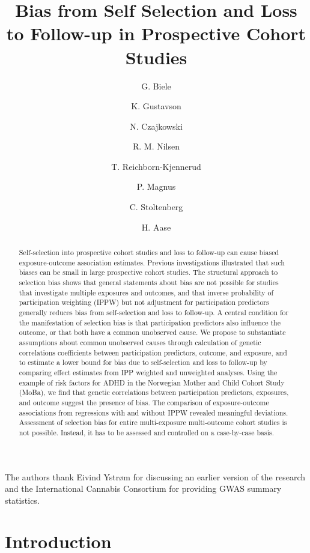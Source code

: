 \documentclass[12pt]{article}
\title{Bias from Self Selection and Loss to Follow-up in Prospective Cohort Studies}
\author{G. Biele \and K. Gustavson \and N. Czajkowski \and R. M. Nilsen \and T. Reichborn-Kjennerud \and P. Magnus \and C. Stoltenberg \and H. Aase}
\begin{document}
		\begin{titlepage}
			\maketitle
			\begin{abstract}
				Self-selection into prospective cohort studies and loss to follow-up can cause biased exposure-outcome association estimates. Previous investigations illustrated that such biases can be small in large prospective cohort studies. The structural approach to selection bias shows that general statements about bias are not possible for studies that investigate multiple exposures and outcomes, and that inverse probability of participation weighting (IPPW) but not adjustment for participation predictors generally reduces bias from self-selection and loss to follow-up. A central condition for the manifestation of selection bias is that participation predictors also influence the outcome, or that both have a common unobserved cause.  We propose to substantiate assumptions about common unobserved causes through calculation of genetic correlations coefficients between participation predictors, outcome, and exposure, and to estimate a lower bound for bias due to self-selection and loss to follow-up by comparing effect estimates from IPP weighted and unweighted analyses. Using the example of risk factors for ADHD in the Norwegian Mother and Child Cohort Study (MoBa), we find that genetic correlations between participation predictors, exposures, and outcome suggest the presence of bias. The comparison of exposure-outcome associations from regressions with and without IPPW revealed meaningful deviations. Assessment of selection bias for entire multi-exposure multi-outcome cohort studies is not possible. Instead, it has to be assessed and controlled on a case-by-case basis.
			\end{abstract}
			
			
			The authors thank Eivind Ystrøm for discussing an earlier version of the research and the International Cannabis Consortium for providing GWAS summary statistics.
		\end{titlepage}


\section{Introduction}
\end{document}
